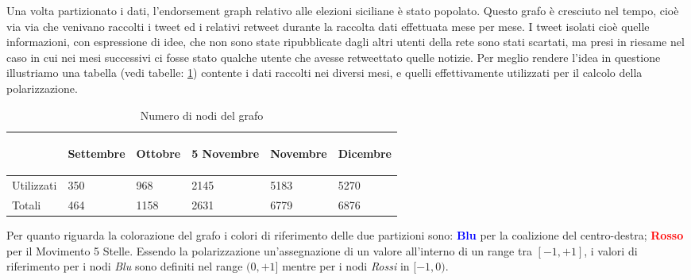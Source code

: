 Una volta partizionato i dati, l'endorsement graph relativo alle elezioni siciliane  è stato popolato. Questo grafo è cresciuto nel tempo, cioè via via che venivano raccolti i tweet ed i relativi retweet durante la raccolta dati effettuata mese per mese. I tweet isolati cioè quelle informazioni, con espressione di idee, che non sono state ripubblicate dagli altri utenti della rete sono stati scartati, ma presi in riesame nel caso in cui nei mesi successivi ci fosse stato qualche utente che avesse retweettato quelle notizie.
Per meglio rendere l'idea in questione illustriamo una tabella (vedi tabelle: \ref{Noditotali}) contente i dati raccolti nei diversi mesi, e quelli effettivamente utilizzati per il calcolo della polarizzazione.
\begin{table}

\begin{tabular}{ |p{1.75cm}|p{2cm}|p{2cm}|p{2.5cm}|p{2cm}|p{2cm}| }
 \hline
 
 \begin{center}
 \textbf{}
 \end{center} & \begin{center}
 \textbf{Settembre}
 \end{center}& \begin{center}
 \textbf{Ottobre}
 \end{center} &\begin{center}
 \textbf{5 Novembre}
 \end{center} &\begin{center}
 \textbf{Novembre}
 \end{center} &\begin{center}
 \textbf{Dicembre}
 \end{center} \\
 \hline
 Utilizzati &350 & 968 & 2145 &5183 &5270  \\ \hline
 Totali &464 & 1158 & 2631 &6779 & 6876  \\ 
 \hline
\end{tabular}
\caption{Numero di nodi del grafo}
 \label{Noditotali}
\end{table}
Per quanto riguarda la colorazione del grafo i colori di riferimento delle due partizioni sono: \textcolor{blue}{\textbf{Blu}} per la coalizione del centro-destra; \textcolor{red}{\textbf{Rosso}} per il Movimento 5 Stelle.
Essendo la polarizzazione un'assegnazione di un valore all'interno di un range tra $[-1,+1]$, i valori di riferimento per i nodi \textit{Blu} sono definiti nel range $(0,+1]$ mentre per i nodi \textit{Rossi} in $[-1,0)$.
